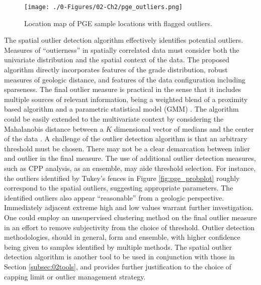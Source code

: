 \begin{figure}[htb!]
    \centering
    \texttt{[image: ./0-Figures/02-Ch2/pge\_outliers.png]}
    \caption{Location map of \gls{PGE} sample locations with flagged outliers.}
    \label{fig:pge_outliers}
\end{figure}

The spatial outlier detection algorithm effectively identifies potential outliers. Measures of ``outierness'' in spatially correlated data must consider both the univariate distribution and the spatial context of the data. The proposed algorithm directly incorporates features of the grade distribution, robust measures of geologic distance, and features of the data configuration including sparseness. The final outlier measure is practical in the sense that it includes multiple sources of relevant information, being a weighted blend of a proximity based algorithm and a parametric statistical model (\gls{GMM}) \citep{li2022ecod}. The algorithm could be easily extended to the multivariate context by considering the Mahalanobis distance between a $K$ dimensional vector of medians and the center of the data \citep{chen2008detecting}. A challenge of the outlier detection algorithm is that an arbitrary threshold must be chosen. There may not be a clear demarcation between inlier and outlier in the final measure. The use of additional outlier detection measures, such as \gls{CPP} analysis, as an ensemble, may aide threshold selection. For instance, the outliers identified by Tukey's fences in Figure \ref{fig:pge_probplot} roughly correspond to the spatial outliers, suggesting appropriate parameters. The identified outliers also appear ``reasonable'' from a geologic perspective. Immediately adjacent extreme high and low values warrant further investigation. One could employ an unsupervised clustering method on the final outlier measure in an effort to remove subjectivity from the choice of threshold. Outlier detection methodologies, should in general, form and ensemble, with higher confidence being given to samples identified by multiple methods. The spatial outlier detection algorithm is another tool to be used in conjunction with those in Section \ref{subsec:02tools}, and provides further justification to the choice of capping limit or outlier management strategy.


